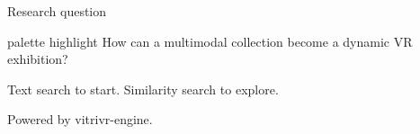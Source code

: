 \begin{frame}[c]{Research question}
\begin{beamercolorbox}[sep=1em,rounded=true]{palette highlight}
\centering\Large
How can a multimodal collection become a dynamic VR exhibition?
\end{beamercolorbox}
\vspace{0.6cm}
\centering\large
Text search to start. Similarity search to explore.

\vspace{0.3cm}
\normalsize Powered by vitrivr-engine.
\end{frame}
